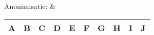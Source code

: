 Anonimisatie: &
\begin{tabular}{|c|c|c|c|c|c|c|c|c|c|}
	\hline 
	\textbf{A} & \textbf{B} & \textbf{C} & \textbf{D} & \textbf{E} & \textbf{F} & \textbf{G} & \textbf{H} & \textbf{I} & \textbf{J} \\
	\hline 
\end{tabular} \\